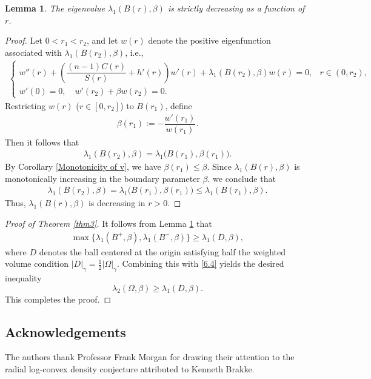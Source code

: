 \documentclass[11pt,leqno]{amsart}
\newtheorem{lemma}{Lemma}[section]
\numberwithin{equation}{section}
\begin{document}
\begin{lemma}\label{lamba monotonicity}
    The eigenvalue $\lambda_{1}(B(r),\beta)$ is strictly decreasing as a function of $r$.
\end{lemma}

\begin{proof}
    Let $0<r_{1}<r_{2}$, and let $w(r)$ denote the positive eigenfunction associated with $\lambda_{1}(B(r_{2}),\beta)$, i.e., 
    \begin{align*}
    \begin{cases}
       w''(r)+\left(\dfrac{(n-1)C(r)}{S(r)}+h'(r)\right)w'(r)+\lambda_{1}(B(r_{2}),\beta)w(r)=0, & r\in (0,r_{2}),\\
        w'(0)=0,\quad w'(r_{2})+\beta w(r_{2})=0.
    \end{cases}
    \end{align*}
    Restricting $w(r)$ ($r\in [0, r_2]$) to $B(r_1)$, define 
    \begin{align*}
        \beta(r_{1}):=-\dfrac{w'(r_{1})}{w(r_{1})}.
    \end{align*}
  Then  it follows that
    \begin{align*}
        \lambda_{1}(B(r_{2}),\beta)=\lambda_{1}\big(B(r_{1}),\beta(r_{1})\big).
    \end{align*}
    By Corollary \ref{Monotonicity of v}, we have $\beta(r_{1})\leq \beta$. Since $\lambda_{1}(B(r),\beta)$ is monotonically increasing in the boundary parameter $\beta$. we conclude that
    \begin{align*}
        \lambda_{1}(B(r_{2}),\beta)
        =\lambda_{1}\big(B(r_{1}),\beta(r_{1})\big)
        \leq \lambda_{1}(B(r_{1}),\beta).
    \end{align*}
    Thus, $\lambda_{1}(B(r),\beta)$ is decreasing in $r>0$.
\end{proof}

\begin{proof}[Proof of Theorem \ref{thm3}]
  It follows from Lemma \ref{lamba monotonicity} that
\begin{align*}
    \max\big\{\lambda_{1}(B^{+},\beta),\lambda_{1}(B^{-},\beta)\big\}\geq \lambda_{1}(D,\beta),
\end{align*}
where $D$ denotes the ball centered at the origin satisfying  half the weighted volume  condition $|D|_{\gamma}=\frac{1}{2}|\Omega|_{\gamma}$. Combining this with \eqref{6.4} yields the desired inequality
$$ \lambda_2(\Omega,\beta)\ge \lambda_1(D,\beta).$$
This completes the proof. 
\end{proof}
\subsection*{Acknowledgements}
The authors thank Professor Frank Morgan for drawing their attention
to the radial log-convex density conjecture attributed to Kenneth Brakke.

 
	
\end{document}
